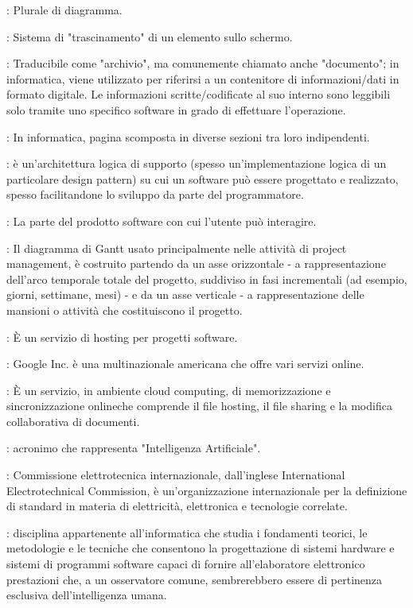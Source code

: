 {		%
		: Plurale di diagramma.

		: Sistema di "trascinamento" di un elemento sullo schermo.


		: Traducibile come "archivio", ma comunemente chiamato anche "documento"; in informatica, viene utilizzato per riferirsi a un contenitore di informazioni/dati in formato digitale. Le informazioni scritte/codificate al suo interno sono leggibili solo tramite uno specifico software in grado di effettuare l'operazione.

		: In informatica, pagina scomposta in diverse sezioni tra loro indipendenti.

		 : è un'architettura logica di supporto (spesso un'implementazione logica di un particolare design pattern) su cui un software può essere progettato e realizzato, spesso facilitandone lo sviluppo da parte del programmatore.

		 : La parte del prodotto software con cui l'utente può interagire.

		: Il diagramma di Gantt usato principalmente nelle attività di project management, è costruito partendo da un asse orizzontale - a rappresentazione dell'arco temporale totale del progetto, suddiviso in fasi incrementali (ad esempio, giorni, settimane, mesi) - e da un asse verticale - a rappresentazione delle mansioni o attività che costituiscono il progetto.

		: È un servizio di hosting per progetti software.

		: Google Inc. è una multinazionale americana che offre vari servizi online.

		: È un servizio, in ambiente cloud computing, di memorizzazione e sincronizzazione onlineche comprende il file hosting, il file sharing e la modifica collaborativa di documenti.

		: acronimo che rappresenta "Intelligenza Artificiale".

		: Commissione elettrotecnica internazionale, dall'inglese International Electrotechnical Commission, è un'organizzazione internazionale per la definizione di standard in materia di elettricità, elettronica e tecnologie correlate.

		: disciplina appartenente all'informatica che studia i fondamenti teorici, le metodologie e le tecniche che consentono la progettazione di sistemi hardware e sistemi di programmi software capaci di fornire all’elaboratore elettronico prestazioni che, a un osservatore comune, sembrerebbero essere di pertinenza esclusiva dell’intelligenza umana.

}
